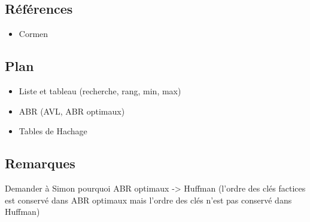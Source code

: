 \documentclass[../../Agregation.tex]{subfiles}
\begin{document}

\dvts

\subsection{Références}

\begin{itemize}
	\item Cormen
\end{itemize}

\subsection{Plan}

\begin{itemize}
	\item Liste et tableau (recherche, rang, min, max)
	\item ABR (AVL, ABR optimaux)
	\item Tables de Hachage
\end{itemize}

\subsection{Remarques}

Demander à Simon pourquoi ABR optimaux -> Huffman (l'ordre des clés factices est conservé dans ABR optimaux mais l'ordre des clés n'est pas conservé dans Huffman)
\end{document}
